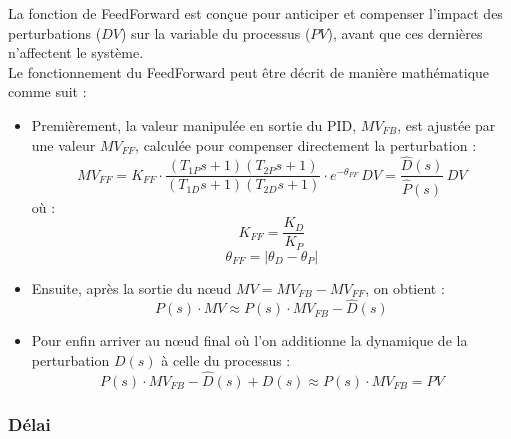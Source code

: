 La fonction de FeedForward est conçue pour anticiper et compenser l'impact des perturbations ($DV$) sur la variable du processus ($PV$), 
avant que ces dernières n'affectent le système.
\\Le fonctionnement du FeedForward peut être décrit de manière mathématique comme suit : 
\begin{itemize}
	\item 
	 Premièrement, la valeur manipulée en sortie du PID, $MV_{FB}$, est ajustée par une valeur $MV_{FF}$, calculée pour compenser directement la perturbation :
	\begin{equation} \label{eq:1}
		MV_{FF} = K_{FF}\cdot\frac{(T_{1P}s + 1)(T_{2P}s + 1)}{(T_{1D}s + 1)(T_{2D}s + 1)}\cdot e^{-\theta_{FF}}\,DV = \frac{\hat{D}(s)}{\hat{P}(s)}\,DV
	\end{equation}
	où : 
	\begin{equation}\label{eq:2}
		K_{FF} = \frac{K_D}{K_P}
	\end{equation}
	\begin{equation}\label{eq:3}
		\theta_{FF} = |\theta_D - \theta_P|
	\end{equation}
	\item 
	Ensuite, après la sortie du n\oe{}ud $MV = MV_{FB} - MV_{FF}$, on obtient : 
	\begin{equation}\label{eq:4}
		P(s)\cdot MV \approx P(s)\cdot MV_{FB} - \hat{D}(s)
	\end{equation}
	\item
	 Pour enfin arriver au n\oe{}ud final où l'on additionne la dynamique de la perturbation $D(s)$ à celle du processus : 
	\begin{equation}\label{eq:5}
		P(s)\cdot MV_{FB} - \hat{D}(s) + D(s) \approx P(s)\cdot MV_{FB} = PV
	\end{equation}
\end{itemize}
\subsubsection{Délai}

